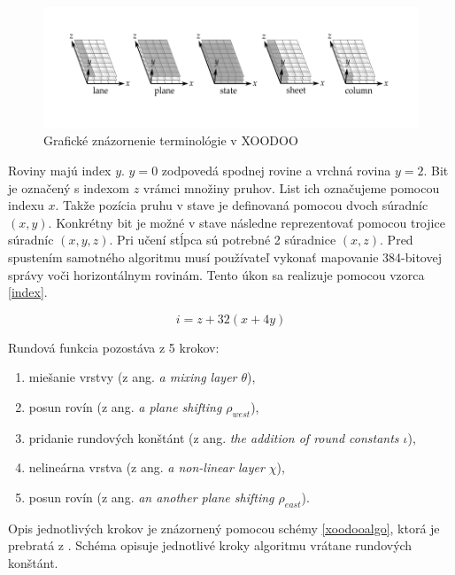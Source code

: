 \begin{figure}[!h]
	\centering
	\includegraphics[width=1\textwidth]{figures/xoodooTerminology}
	\caption{Grafické znázornenie terminológie v XOODOO}
	\label{xoodooterm}
\end{figure}

Roviny majú index $y$. $y=0$ zodpovedá spodnej rovine a vrchná rovina $y=2$. Bit je označený s indexom $z$ vrámci množiny pruhov. List ich označujeme pomocou indexu $x$. Takže pozícia pruhu v stave je definovaná pomocou dvoch súradníc $(x,y)$. Konkrétny bit je možné v stave následne reprezentovať pomocou trojice súradníc $(x,y,z)$. Pri učení stĺpca sú potrebné 2 súradnice $(x,z)$. Pred spustením samotného algoritmu musí používateľ vykonať mapovanie 384-bitovej správy voči horizontálnym rovinám. Tento úkon sa realizuje pomocou vzorca \ref{index}.

\begin{equation}\label{index}
	i=z+32(x+4y)
\end{equation}

Rundová funkcia pozostáva z 5 krokov:
\begin{enumerate}
	\item miešanie vrstvy (z ang. \textit{a mixing layer $\theta$}), 
	\item posun rovín (z ang. \textit{a plane shifting $\rho_{west}$}), 
	\item pridanie rundových konštánt (z ang. \textit{the addition of round constants $\iota$}),
	\item nelineárna vrstva (z ang. \textit{a non-linear layer $\chi$}),
	\item posun rovín (z ang. \textit{an another plane shifting $\rho_{east}$}).
\end{enumerate}
Opis jednotlivých krokov je znázornený pomocou schémy \ref{xoodooalgo}, ktorá je prebratá z \cite{xcb}. Schéma opisuje jednotlivé kroky algoritmu vrátane rundových konštánt. 

